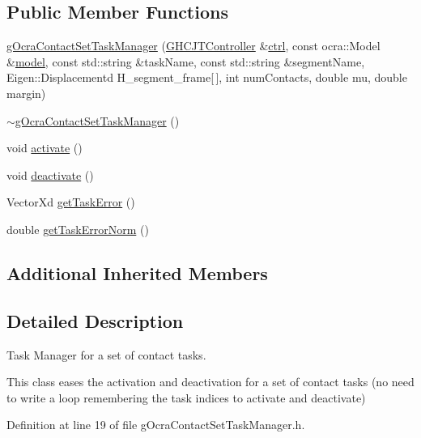 \subsection*{Public Member Functions}
\begin{DoxyCompactItemize}
\item 
\hyperlink{classgocra_1_1gOcraContactSetTaskManager_a4ff54810c8e8497f59a62b1a87e2c001}{g\+Ocra\+Contact\+Set\+Task\+Manager} (\hyperlink{classgocra_1_1GHCJTController}{G\+H\+C\+J\+T\+Controller} \&\hyperlink{classgocra_1_1gOcraTaskManagerBase_a52d76d9b54d92f3d31faeaafda99e4c7}{ctrl}, const ocra\+::\+Model \&\hyperlink{classgocra_1_1gOcraTaskManagerBase_adc439e7170f7120611fc6d009d06404e}{model}, const std\+::string \&task\+Name, const std\+::string \&segment\+Name, Eigen\+::\+Displacementd H\+\_\+segment\+\_\+frame\mbox{[}$\,$\mbox{]}, int num\+Contacts, double mu, double margin)
\item 
\hyperlink{classgocra_1_1gOcraContactSetTaskManager_a26033fec662f654121f63ea627a0f5d7}{$\sim$g\+Ocra\+Contact\+Set\+Task\+Manager} ()
\item 
void \hyperlink{classgocra_1_1gOcraContactSetTaskManager_a0fb5ccaae21c77073a6d0f310fe543a4}{activate} ()
\item 
void \hyperlink{classgocra_1_1gOcraContactSetTaskManager_ad9f3b44b46253e5539e658cf3fd8ca37}{deactivate} ()
\item 
Vector\+Xd \hyperlink{classgocra_1_1gOcraContactSetTaskManager_aa0136e8702029873ba4d82c0edc7c571}{get\+Task\+Error} ()
\item 
double \hyperlink{classgocra_1_1gOcraContactSetTaskManager_ac46c258f0b2762bce969b373baad110a}{get\+Task\+Error\+Norm} ()
\end{DoxyCompactItemize}
\subsection*{Additional Inherited Members}


\subsection{Detailed Description}
Task Manager for a set of contact tasks. 

This class eases the activation and deactivation for a set of contact tasks (no need to write a loop remembering the task indices to activate and deactivate) 

Definition at line 19 of file g\+Ocra\+Contact\+Set\+Task\+Manager.\+h.



